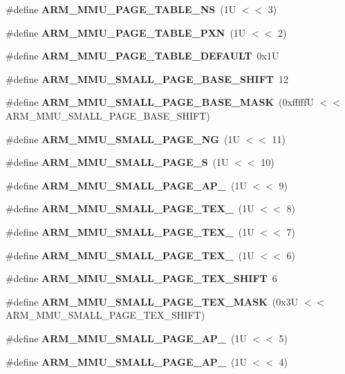 \begin{Indent}
\begin{DoxyCompactItemize}
\item 
\#define {\bfseries A\+R\+M\+\_\+\+M\+M\+U\+\_\+\+P\+A\+G\+E\+\_\+\+T\+A\+B\+L\+E\+\_\+\+NS}~(1\+U $<$$<$ 3)
\item 
\#define {\bfseries A\+R\+M\+\_\+\+M\+M\+U\+\_\+\+P\+A\+G\+E\+\_\+\+T\+A\+B\+L\+E\+\_\+\+P\+XN}~(1\+U $<$$<$ 2)
\item 
\#define {\bfseries A\+R\+M\+\_\+\+M\+M\+U\+\_\+\+P\+A\+G\+E\+\_\+\+T\+A\+B\+L\+E\+\_\+\+D\+E\+F\+A\+U\+LT}~0x1U
\item 
\#define {\bfseries A\+R\+M\+\_\+\+M\+M\+U\+\_\+\+S\+M\+A\+L\+L\+\_\+\+P\+A\+G\+E\+\_\+\+B\+A\+S\+E\+\_\+\+S\+H\+I\+FT}~12
\item 
\#define {\bfseries A\+R\+M\+\_\+\+M\+M\+U\+\_\+\+S\+M\+A\+L\+L\+\_\+\+P\+A\+G\+E\+\_\+\+B\+A\+S\+E\+\_\+\+M\+A\+SK}~(0xfffff\+U $<$$<$ A\+R\+M\+\_\+\+M\+M\+U\+\_\+\+S\+M\+A\+L\+L\+\_\+\+P\+A\+G\+E\+\_\+\+B\+A\+S\+E\+\_\+\+S\+H\+I\+F\+T)
\item 
\#define {\bfseries A\+R\+M\+\_\+\+M\+M\+U\+\_\+\+S\+M\+A\+L\+L\+\_\+\+P\+A\+G\+E\+\_\+\+NG}~(1\+U $<$$<$ 11)
\item 
\#define {\bfseries A\+R\+M\+\_\+\+M\+M\+U\+\_\+\+S\+M\+A\+L\+L\+\_\+\+P\+A\+G\+E\+\_\+S}~(1\+U $<$$<$ 10)
\item 
\#define {\bfseries A\+R\+M\+\_\+\+M\+M\+U\+\_\+\+S\+M\+A\+L\+L\+\_\+\+P\+A\+G\+E\+\_\+\+A\+P\+\_}~(1\+U $<$$<$ 9)
\item 
\#define {\bfseries A\+R\+M\+\_\+\+M\+M\+U\+\_\+\+S\+M\+A\+L\+L\+\_\+\+P\+A\+G\+E\+\_\+\+T\+E\+X\+\_}~(1\+U $<$$<$ 8)
\item 
\#define {\bfseries A\+R\+M\+\_\+\+M\+M\+U\+\_\+\+S\+M\+A\+L\+L\+\_\+\+P\+A\+G\+E\+\_\+\+T\+E\+X\+\_}~(1\+U $<$$<$ 7)
\item 
\#define {\bfseries A\+R\+M\+\_\+\+M\+M\+U\+\_\+\+S\+M\+A\+L\+L\+\_\+\+P\+A\+G\+E\+\_\+\+T\+E\+X\+\_}~(1\+U $<$$<$ 6)
\item 
\#define {\bfseries A\+R\+M\+\_\+\+M\+M\+U\+\_\+\+S\+M\+A\+L\+L\+\_\+\+P\+A\+G\+E\+\_\+\+T\+E\+X\+\_\+\+S\+H\+I\+FT}~6
\item 
\#define {\bfseries A\+R\+M\+\_\+\+M\+M\+U\+\_\+\+S\+M\+A\+L\+L\+\_\+\+P\+A\+G\+E\+\_\+\+T\+E\+X\+\_\+\+M\+A\+SK}~(0x3\+U $<$$<$ A\+R\+M\+\_\+\+M\+M\+U\+\_\+\+S\+M\+A\+L\+L\+\_\+\+P\+A\+G\+E\+\_\+\+T\+E\+X\+\_\+\+S\+H\+I\+F\+T)
\item 
\#define {\bfseries A\+R\+M\+\_\+\+M\+M\+U\+\_\+\+S\+M\+A\+L\+L\+\_\+\+P\+A\+G\+E\+\_\+\+A\+P\+\_}~(1\+U $<$$<$ 5)
\item 
\#define {\bfseries A\+R\+M\+\_\+\+M\+M\+U\+\_\+\+S\+M\+A\+L\+L\+\_\+\+P\+A\+G\+E\+\_\+\+A\+P\+\_}~(1\+U $<$$<$ 4)

\end{DoxyCompactItemize}
\end{Indent}
